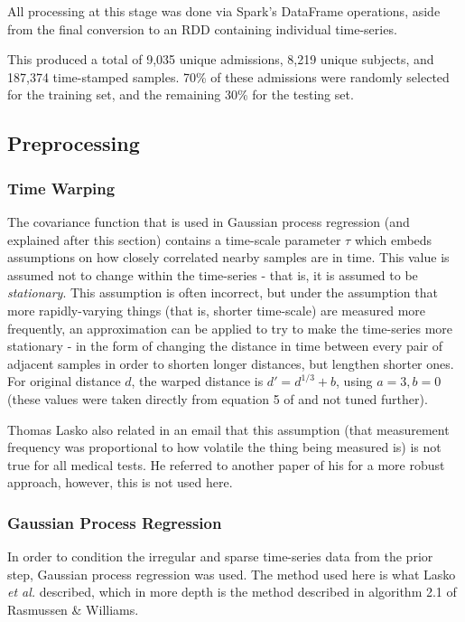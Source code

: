 \documentclass[journal]{IEEEtran}
\begin{document}
All processing at this stage was done via Spark's DataFrame
operations, aside from the final conversion to an RDD containing
individual time-series.

This produced a total of 9,035 unique admissions, 8,219 unique
subjects, and 187,374 time-stamped samples.  70\% of these admissions
were randomly selected for the training set, and the remaining 30\%
for the testing set.

\subsection{Preprocessing}

\subsubsection{Time Warping}

The covariance function that is used in Gaussian process regression
(and explained after this section) contains a time-scale parameter
$\tau$ which embeds assumptions on how closely correlated nearby
samples are in time.  This value is assumed not to change within the
time-series - that is, it is assumed to be
\textit{stationary}\cite{Lasko2013}.  This assumption is often
incorrect, but under the assumption that more rapidly-varying things
(that is, shorter time-scale) are measured more frequently, an
approximation can be applied to try to make the time-series more
stationary - in the form of changing the distance in time between
every pair of adjacent samples in order to shorten longer distances,
but lengthen shorter ones\cite{Lasko2013}.  For original distance $d$,
the warped distance is $d'=d^{1/3}+b$, using $a=3, b=0$ (these
values were taken directly from equation 5 of \cite{Lasko2013} and not
tuned further).

Thomas Lasko also related in an email that this assumption (that
measurement frequency was proportional to how volatile the thing being
measured is) is not true for all medical tests.  He referred to
another paper of his\cite{Lasko2015} for a more robust approach,
however, this is not used here.

\subsubsection{Gaussian Process Regression}

In order to condition the irregular and sparse time-series data from
the prior step, Gaussian process regression was used.  The method used
here is what Lasko \emph{et al.}\cite{Lasko2013} described, which in
more depth is the method described in algorithm 2.1 of Rasmussen \&
Williams\cite{Rasmussen2004}.
\end{document}
